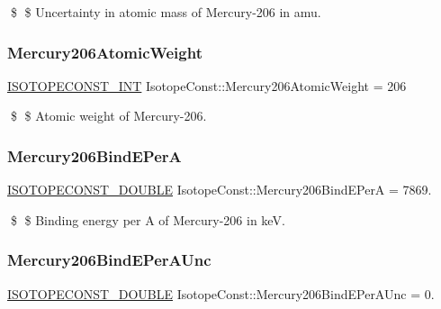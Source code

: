 \$ \$ Uncertainty in atomic mass of Mercury-\/206 in amu. \mbox{\label{group___isotope_const-_mercury-_hg206_ga60980eecc430fd04c26db44a927eb097}} 
\subsubsection{\texorpdfstring{Mercury206\+Atomic\+Weight}{Mercury206AtomicWeight}}
{\footnotesize\ttfamily \mbox{\hyperlink{group___isotope_const-_macros_ga5f18360b3e99483a35c32d789e62621c}{I\+S\+O\+T\+O\+P\+E\+C\+O\+N\+S\+T\+\_\+\+I\+NT}} Isotope\+Const\+::\+Mercury206\+Atomic\+Weight = 206}

\$ \$ Atomic weight of Mercury-\/206. \mbox{\label{group___isotope_const-_mercury-_hg206_ga7a15d5680a4623d6202de0f017b790c8}} 
\subsubsection{\texorpdfstring{Mercury206\+Bind\+E\+PerA}{Mercury206BindEPerA}}
{\footnotesize\ttfamily \mbox{\hyperlink{group___isotope_const-_macros_ga8f45a7272ce02c0b4c65c44636ed719a}{I\+S\+O\+T\+O\+P\+E\+C\+O\+N\+S\+T\+\_\+\+D\+O\+U\+B\+LE}} Isotope\+Const\+::\+Mercury206\+Bind\+E\+PerA = 7869.}

\$ \$ Binding energy per A of Mercury-\/206 in keV. \mbox{\label{group___isotope_const-_mercury-_hg206_ga16dff38ac6728ee6ea43af93b8c28308}} 
\subsubsection{\texorpdfstring{Mercury206\+Bind\+E\+Per\+A\+Unc}{Mercury206BindEPerAUnc}}
{\footnotesize\ttfamily \mbox{\hyperlink{group___isotope_const-_macros_ga8f45a7272ce02c0b4c65c44636ed719a}{I\+S\+O\+T\+O\+P\+E\+C\+O\+N\+S\+T\+\_\+\+D\+O\+U\+B\+LE}} Isotope\+Const\+::\+Mercury206\+Bind\+E\+Per\+A\+Unc = 0.}

